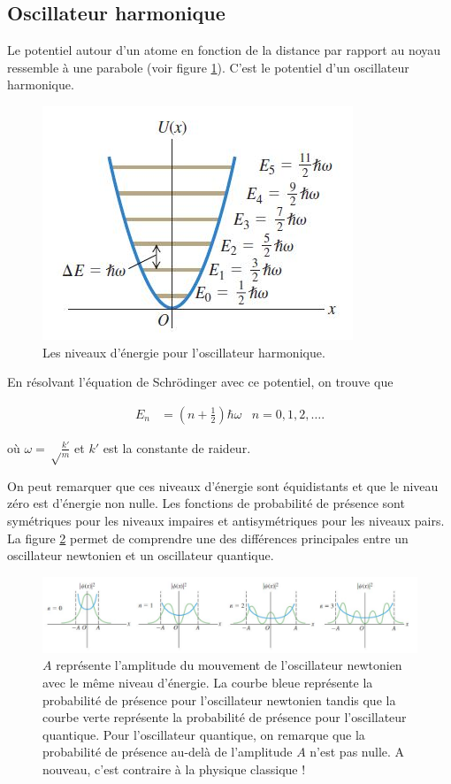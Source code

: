 \subsection{Oscillateur harmonique}
Le potentiel autour d'un atome en fonction de la distance
par rapport au noyau ressemble à une parabole (voir figure
\ref{fig:energy_level_osc}). C'est le potentiel d'un oscillateur
harmonique.

\begin{figure}[ht]
	\centering
	\includegraphics[scale=0.8]{img/energy_level_osc.jpg}
	\caption{Les niveaux d'énergie pour l'oscillateur
	harmonique.}
	\label{fig:energy_level_osc}
\end{figure}

En résolvant l'équation de Schrödinger avec ce potentiel,
on trouve que

\begin{align*}
  E_n & = \left(n+\frac{1}{2}\right)\hbar\omega & n = 0, 1, 2, \ldots.
\end{align*}

où $\omega = \sqrt\frac{k'}{m}$ et
$k'$ est la constante de raideur.

On peut remarquer que ces niveaux d'énergie sont équidistants et que
le niveau zéro est d'énergie non nulle. Les fonctions de probabilité 
de présence sont symétriques pour les niveaux impaires et antisymétriques 
pour les niveaux pairs. La figure \ref{fig:newton_vs_quantum_osc}
permet de comprendre une des différences principales entre
un oscillateur newtonien et un oscillateur quantique.

\begin{figure}[ht]
	\centering
	\includegraphics[scale=0.8]{img/newton_vs_quantum_osc.jpg}
	\caption{$A$ représente l'amplitude du mouvement de l'oscillateur
	newtonien avec le même niveau d'énergie. La courbe bleue représente
	la probabilité de présence pour l'oscillateur newtonien tandis que
	la courbe verte représente la probabilité de présence pour l'oscillateur
	quantique. Pour l'oscillateur quantique, on remarque que la probabilité
	de présence au-delà de l'amplitude $A$ n'est pas nulle. A nouveau,
	c'est contraire à la physique classique !}
	\label{fig:newton_vs_quantum_osc}
\end{figure}

